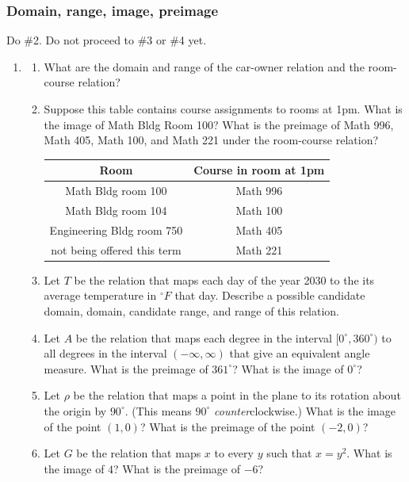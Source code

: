 \documentclass[11pt]{article}
\newcommand\degrees{^\circ}
\theoremstyle{definition}
\begin{document}
\vfill 
\subsubsection*{Domain, range, image, preimage}

Do \#2. Do not proceed to \#3 or \#4 yet.

\begin{enumerate}[resume]
\item \begin{enumerate}
	\item What are the domain and range of the car-owner relation and the room-course relation? 

	\item Suppose this table contains course assignments to rooms at 1pm. What is the image of Math Bldg Room 100? What is the preimage of Math 996, Math 405, Math 100, and Math 221 under the room-course relation? 

    \begin{center}
    \begin{tabular}{|c|c|}
    \hline
    Room & Course in room at 1pm \\ \hline
    Math Bldg room 100 & Math 996 \\ 
    Math Bldg room 104 & Math 100 \\ 
    Engineering Bldg room 750 & Math 405 \\ 
    not being offered this term & Math 221 \\ \hline
    \end{tabular}
    \end{center}

\item Let $T$ be the relation that maps each day of the year 2030 to the its average temperature in $\degrees F$ that day. Describe a possible candidate domain, domain, candidate range, and range of this relation.

\item Let $A$ be the relation that maps each degree in the interval $[0\degrees, 360\degrees)$ to all degrees in the interval $(-\infty,\infty)$ that give an equivalent angle measure. What is the preimage of $361\degrees$? What is the image of $0\degrees$? 

\item Let $\rho$ be the relation that maps a point in the plane to its rotation about the origin by $90\degrees$.  (This means $90\degrees$ {\it counter}clockwise.) What is the image of the point $(1,0)$? What is the preimage of the point $(-2,0)$? 

\item Let $G$ be the relation that maps $x$ to every $y$ such that $x=y^2$. What is the image of $4$? What is the preimage of $-6$?
\end{enumerate}
\end{enumerate}
\end{document}
